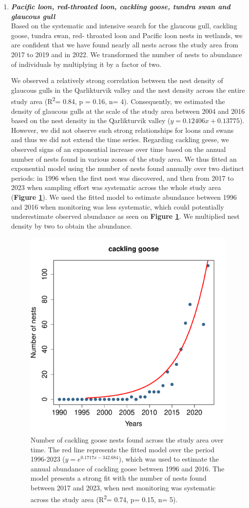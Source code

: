 \documentclass[a4paper,twoside,12pt]{article}
\begin{document}
    	\begin{enumerate}[label=\alph*.]
    		
     \item[] \textit{\textbf{Pacific loon, red-throated loon, cackling goose, tundra swan and glaucous gull}}	\\
Based on the systematic and intensive search for the glaucous gull, cackling goose, tundra swan, red- throated loon and Pacific loon nests in wetlands, we are confident that we have found nearly all nests across the study area from 2017 to 2019 and in 2022. We transformed the number of nests to abundance of individuals by multiplying it by a factor of two. 

We observed a relatively strong correlation between the nest density of glaucous gulls in the Qarlikturvik valley and the nest density across the entire study area (R\textsuperscript{2}= 0.84, p = 0.16, n= 4). Consequently, we estimated the density of glaucous gulls at the scale of the study area between 2004 and 2016 based on the nest density in the Qarlikturvik valley ($y = 0.12406x + 0.13775$). However, we did not observe such strong relationships for loons and swans and thus we did not extend the time series. Regarding cackling geese, we observed signs of an exponential increase over time based on the annual number of nests found in various zones of the study area. We thus fitted an exponential model using the number of nests found annually over two distinct periods: in 1996 when the first nest was discovered, and then from 2017 to 2023 when sampling effort was systematic across the whole study area (\textbf{Figure \ref{figure:cackling}}). We used the fitted model to estimate abundance between 1996 and 2016 when monitoring was less systematic, which could potentially underestimate observed abundance as seen on \textbf{Figure \ref{figure:cackling}}. We multiplied nest density by two to obtain the abundance. 

\begin{figure}[h]
\centering
\includegraphics[width=0.5\linewidth]{figures/cackling_goose_nest_exponential.pdf} 
\caption{Number of cackling goose nests found across the study area over time. The red line represents the fitted model over the period 1996-2023 ($y= e^{0.1717x-342.684}$), which was used to estimate the annual abundance of cackling goose between 1996 and 2016. The model presents a strong fit with the number of nests found between 2017 and 2023, when nest monitoring was systematic across the study area (R\textsuperscript{2}= 0.74, p= 0.15, n= 5).}
\label{figure:cackling}
\end{figure}



\end{enumerate}
\end{document}
